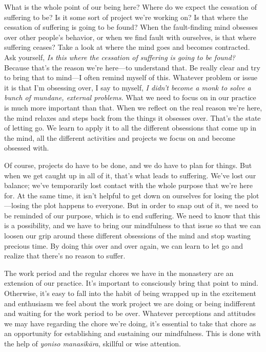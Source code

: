 What is the whole point of our being here? Where do we expect the 
cessation of suffering to be? Is it some sort of project we're working 
on? Is that where the cessation of suffering is going to be found? When 
the fault-finding mind obsesses over other people's behavior, or when 
we find fault with ourselves, is that where suffering ceases? Take a 
look at where the mind goes and becomes contracted. Ask yourself, 
\emph{Is this where the cessation of suffering is going to be found?} 
Because that's the reason we're here---to understand that. Be really 
clear and try to bring that to mind---I often remind myself of this. 
Whatever problem or issue it is that I'm obsessing over, I say to 
myself, \emph{I didn't become a monk to solve a bunch of mundane, 
external problems.} What we need to focus on in our practice is much 
more important than that. When we reflect on the real reason we're 
here, the mind relaxes and steps back from the things it obsesses over. 
That's the state of letting go. We learn to apply it to all the 
different obsessions that come up in the mind, all the different 
activities and projects we focus on and become obsessed with.

Of course, projects do have to be done, and we do have to plan for 
things. But when we get caught up in all of it, that's what leads to 
suffering. We've lost our balance; we've temporarily lost contact with 
the whole purpose that we're here for. At the same time, it isn't 
helpful to get down on ourselves for losing the plot---losing the plot 
happens to everyone. But in order to snap out of it, we need to be 
reminded of our purpose, which is to end suffering. We need to know 
that this is a possibility, and we have to bring our mindfulness to 
that issue so that we can loosen our grip around these different 
obsessions of the mind and stop wasting precious time. By doing this 
over and over again, we can learn to let go and realize that there's no 
reason to suffer.


The work period and the regular chores we have in the monastery are an 
extension of our practice. It's important to consciously bring that 
point to mind. Otherwise, it's easy to fall into the habit of being 
wrapped up in the excitement and enthusiasm we feel about the work 
project we are doing or being indifferent and waiting for the work 
period to be over. Whatever perceptions and attitudes we may have 
regarding the chore we're doing, it's essential to take that chore as 
an opportunity for establishing and sustaining our mindfulness. This is 
done with the help of \emph{yoniso manasikāra}, skillful or wise 
attention.

